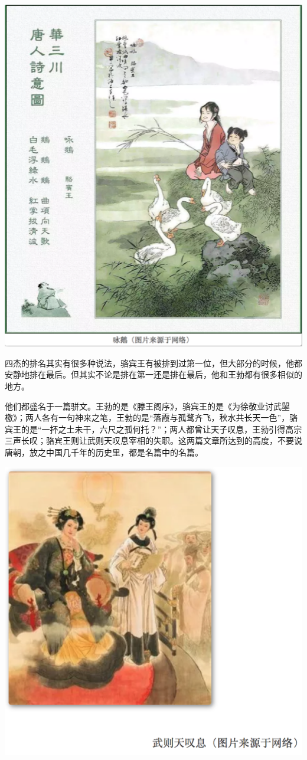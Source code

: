 \documentclass[
]{book}
\begin{document}
\includegraphics[width=7.25in]{images/ctsj7}

四杰的排名其实有很多种说法，骆宾王有被排到过第一位，但大部分的时候，他都安静地排在最后。但其实不论是排在第一还是排在最后，他和王勃都有很多相似的地方。

他们都盛名于一篇骈文。王勃的是《滕王阁序》，骆宾王的是《为徐敬业讨武曌檄》；两人各有一句神来之笔，王勃的是``落霞与孤鹜齐飞，秋水共长天一色''，骆宾王的是``一抔之土未干，六尺之孤何托？''；两人都曾让天子叹息，王勃引得高宗三声长叹；骆宾王则让武则天叹息宰相的失职。这两篇文章所达到的高度，不要说唐朝，放之中国几千年的历史里，都是名篇中的名篇。

\includegraphics[width=8.33in]{images/ctsj8}
\end{document}
